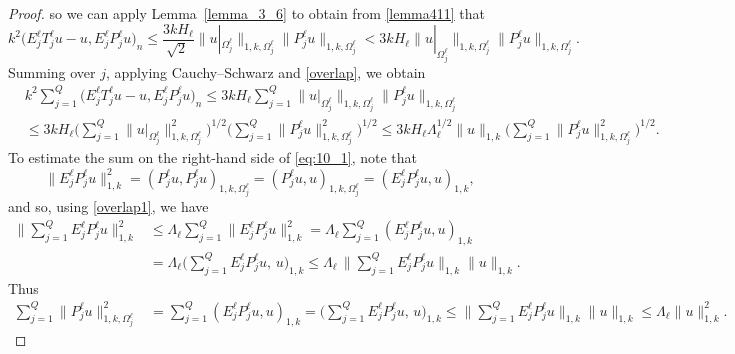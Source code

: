 \documentclass[numbers,webpdf,imaiai]{ima-authoring-template}%
\theoremstyle{thmstyletwo}%
\numberwithin{equation}{section}
\numberwithin{equation}{section}
\begin{document}
{\begin{proof}
so we can apply Lemma~\ref{lemma_3_6} to obtain from \eqref{lemma411} that
\begin{equation*} 	
	k^2\bigl(E^{\ell}_j T^{\ell}_j u-u, E^{\ell}_j P^{\ell}_j u\bigr)_n 
	\le \frac{3kH_{\ell}}{\sqrt{2}\,}\big\|u|_{\Omega^{\ell}_j}\big\|_{1,k,\Omega^{\ell}_j}\big\|P^{\ell}_j u\big\|_{1,k,\Omega^{\ell}_j}
	< 3kH_{\ell}\big\|u|_{\Omega^{\ell}_j}\big\|_{1,k,\Omega^{\ell}_j}\big\|P^{\ell}_j u\big\|_{1,k,\Omega^{\ell}_j}.
\end{equation*}
Summing over $j$, applying Cauchy--Schwarz and \eqref{overlap}, we obtain
\begin{align}
	& k^2 \sum_{j=1}^{Q} \bigl(E^{\ell}_j T^{\ell}_j u-u, E^{\ell}_j P^{\ell}_j u\bigr)_n 
	\le 3kH_{\ell} \sum_{j=1}^{Q} \big\|u|_{\Omega^{\ell}_j}\big\|_{1,k,\Omega^{\ell}_j}\|P^{\ell}_j u\|_{1,k,\Omega^{\ell}_j}
	\nonumber\\[0.5ex]
	&\le 3kH_{\ell} \Biggl(\sum_{j=1}^{Q} \big\|u|_{\Omega^{\ell}_j}\big\|_{1,k,\Omega^{\ell}_j}^2\Biggr)^{1/2}
	\Biggl( \sum_{j=1}^{Q} \|P^{\ell}_j u\|_{1,k,\Omega^{\ell}_j}^2\Biggr)^{1/2} 
	\le 3kH_{\ell} \Lambda_{\ell}^{1/2} \|u\|_{1,k}\Biggl( \sum_{j=1}^{Q} \|P^{\ell}_j u\|_{1,k,\Omega^{\ell}_j}^2\Biggr)^{1/2}.
	\label{eq:10_1}
\end{align}
To estimate the sum on the right-hand side of \eqref{eq:10_1}, note that
\begin{equation*}
	\|E_j^\ell P_j^\ell u \|_{1,k}^2 
	= (P_j^\ell u,P_j^\ell u)_{1,k,\Omega_j^\ell} 
	= (P_j^\ell u, u)_{1,k,\Omega_j^\ell} = (E_j^\ell P_j^\ell u, u)_{1,k}, 
\end{equation*}
and so, using \eqref{overlap1}, we have
\begin{align*}
	\Bigg\|\sum_{j=1}^{Q} E^{\ell}_j P^{\ell}_j u\Bigg\|_{1,k}^2
	&\le \Lambda_{\ell} \sum_{j=1}^{Q} \|E^{\ell}_j P^{\ell}_j u\|_{1,k}^2 
	= \Lambda_{\ell} \sum_{j=1}^{Q} (E^{\ell}_j P^{\ell}_j u,u)_{1,k}
	\\[0.5ex]
	&= \Lambda_{\ell} \Biggl(\sum_{j=1}^{Q} E^{\ell}_j P^{\ell}_j u,\,u\Biggr)_{1,k}
	\le \Lambda_{\ell} \,\Bigg\|\sum_{j=1}^{Q} E^{\ell}_j P^{\ell}_j u\Bigg\|_{1,k} \|u\|_{1,k}.
\end{align*}
Thus
\begin{align*}
    \sum_{j=1}^{Q} \|P^{\ell}_j u\|_{1,k,\Omega^{\ell}_j}^2
	&= \sum_{j=1}^{Q} (E^{\ell}_j P^{\ell}_j u,u)_{1,k} 
	= \Biggl(\sum_{j=1}^{Q} E^{\ell}_j P^{\ell}_j u,\,u\Biggr)_{1,k} 
	\le \Bigg\|\sum_{j=1}^{Q} E^{\ell}_j P^{\ell}_j u\Bigg\|_{1,k}\|u\|_{1,k}
	\le \Lambda_{\ell} \|u\|_{1,k}^2.
\end{align*}

\end{proof}}
\end{document}
